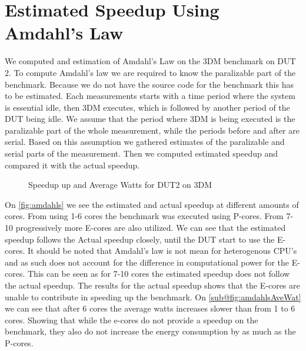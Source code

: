\section{Estimated Speedup Using Amdahl's Law}\label{app:Amdahls}


We computed and estimation of Amdahl's Law on the 3DM benchmark on DUT 2. To compute Amdahl's law we are required to know the paralizable part of the benchmark. Because we do not have the source code for the benchmark this has to be estimated. Each measurements starts with a time period where the system is essential idle, then 3DM executes, which is followed by another period of the DUT being idle. We assume that the period where 3DM is being executed is the paralizable part of the whole measurement, while the periods before and after are serial. Based on this assumption we gathered estimates of the paralizable and serial parts of the measurement. Then we computed estimated speedup and compared it with the actual speedup.

\begin{figure}[H]
    \centering
    \begin{subfigure}[t]{0.4\textwidth}
        \centering
        
    \end{subfigure}
    \hspace{2cm}
    \begin{subfigure}[t]{0.4\textwidth}
        \centering
        
    \end{subfigure}
    \caption{Speedup up and Average Watts for DUT2 on 3DM}
\end{figure}
%
%

On \cref{fig:amdahls} we see the estimated and actual speedup at different amounts of cores. From using 1-6 cores the benchmark was executed using P-cores. From 7-10 progressively more E-cores are also utilized. We can see that the estimated speedup follows the Actual speedup closely, until the DUT start to use the E-cores. It should be noted that Amdahl's law is not mean for heterogenous CPU's and as such does not account for the difference in computational power for the E-cores. This can be seen as for 7-10 cores the estimated speedup does not follow the actual speedup. The results for the actual speedup shows that the E-cores are unable to contribute in speeding up the benchmark. On \cref{sub@fig:amdahlsAveWat} we can see that after 6 cores the average watts increases slower than from 1 to 6 cores. Showing that while the e-cores do not provide a speedup on the benchmark, they also do not increase the energy consumption by as much as the P-cores. 

